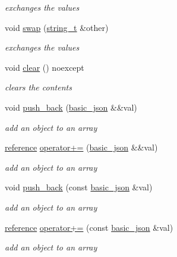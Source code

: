 \begin{DoxyCompactItemize}
\begin{DoxyCompactList}\small\item\em exchanges the values \end{DoxyCompactList}\item 
void \hyperlink{classnlohmann_1_1basic__json_a86089c703a2e563b9f760c2f8408efa7}{swap} (\hyperlink{classnlohmann_1_1basic__json_ab63e618bbb0371042b1bec17f5891f42}{string\-\_\-t} \&other)
\begin{DoxyCompactList}\small\item\em exchanges the values \end{DoxyCompactList}\item 
void \hyperlink{classnlohmann_1_1basic__json_ad6e51670e9c0052856f3fee01df5c44f}{clear} () noexcept
\begin{DoxyCompactList}\small\item\em clears the contents \end{DoxyCompactList}\item 
void \hyperlink{classnlohmann_1_1basic__json_a486b96adbf4886c38e38c952394a220f}{push\-\_\-back} (\hyperlink{classnlohmann_1_1basic__json}{basic\-\_\-json} \&\&val)
\begin{DoxyCompactList}\small\item\em add an object to an array \end{DoxyCompactList}\item 
\hyperlink{classnlohmann_1_1basic__json_a3ec8e17be8732fe436e9d6733f52b7a3}{reference} \hyperlink{classnlohmann_1_1basic__json_a1c1aa2d148a3e4ce0d4e50cf5b894f41}{operator+=} (\hyperlink{classnlohmann_1_1basic__json}{basic\-\_\-json} \&\&val)
\begin{DoxyCompactList}\small\item\em add an object to an array \end{DoxyCompactList}\item 
void \hyperlink{classnlohmann_1_1basic__json_a6f3dfd3e83a1e907d7946b47fcd7ceba}{push\-\_\-back} (const \hyperlink{classnlohmann_1_1basic__json}{basic\-\_\-json} \&val)
\begin{DoxyCompactList}\small\item\em add an object to an array \end{DoxyCompactList}\item 
\hyperlink{classnlohmann_1_1basic__json_a3ec8e17be8732fe436e9d6733f52b7a3}{reference} \hyperlink{classnlohmann_1_1basic__json_a80c21170db6b5ffd9274b3f351cebadc}{operator+=} (const \hyperlink{classnlohmann_1_1basic__json}{basic\-\_\-json} \&val)
\begin{DoxyCompactList}\small\item\em add an object to an array \end{DoxyCompactList}\item 

\end{DoxyCompactItemize}
